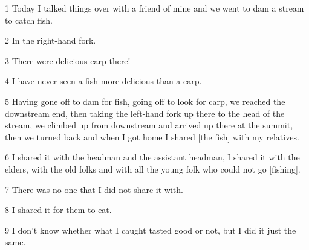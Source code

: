 
1 Today I talked things over with a friend of mine and we went to dam a stream
to catch fish.

2 In the right-hand fork.

3 There were delicious carp there!

4 I have never seen a fish more delicious than a carp.

5 Having gone off to dam for fish, going off to look for carp, we reached the downstream
end, then taking the left-hand fork up there to the head of the stream, we climbed
up from downstream and arrived up there at the summit, then we turned back and
when I got home I shared [the fish] with my relatives.

6 I shared it with the headman and the assistant headman, I shared it with the
elders, with the old folks and with all the young folk who could not go [fishing].

7 There was no one that I did not share it with.

8 I shared it for them to eat.

9 I don't know whether what I caught tasted good or not, but I did it just the
same.


